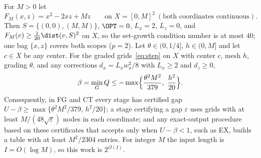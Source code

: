 \begin{proposition}
\label{prop:twocenters}
For $M>0$ let
\[
F_M(x,z)=x^2-2xz+Mz\qquad\text{on }X=[0,M]^2\ (\text{both coordinates
continuous}).
\]
Then $S=\{(0,0),(M,M)\}$, $\OPT=0$, $L_x=2$, $L_z=0$, and
$F_M(v)\ge\frac1{20}\dist(v,S)^2$ on $X$, so the set-growth condition number
is at most $40$; one bag $\{x,z\}$ covers both scopes ($p=2$).
Let $\theta\in(0,1/4]$, $h\in(0,M]$ and let $c\in X$ be any center. For the
graded grids~\eqref{eq:step} on $X$ with center $c$, mesh $h$, grading
$\theta$, and any corrections $d_x=L_xw_x^2/8$ with $L_x\ge2$ and $d_z\ge0$,
\begin{equation}\label{eq:twocenters}
\beta=\min_GQ\le-\max\Bigl\{\frac{\theta^2M^2}{379},\ \frac{h^2}{20}\Bigr\}.
\end{equation}
Consequently, in FG and CT every stage has certified gap
$U-\beta\ge\max\{\theta^2M^2/379,\,h^2/20\}$; a stage certifying a
gap $\varepsilon$ uses grids with at least $M/(48\sqrt\varepsilon)$ nodes in
each coordinate; and any exact-output procedure based on these certificates
that accepts only when $U-\beta<1$, such as EX, builds a table with at least
$M^2/2304$ entries. For integer $M$ the input length is $I=O(\log M)$, so
this work is $2^{\Omega(I)}$.
\end{proposition}

